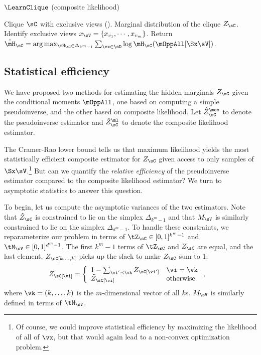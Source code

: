 \begin{algorithm}
  \caption{$\LearnClique$ (composite likelihood)}
  \label{algo:piecewise}
  \begin{algorithmic}
    \REQUIRE Clique $\sC$ with exclusive views ().
    \ENSURE Marginal distribution of the clique $Z_\sC$.
\STATE Identify exclusive views $x_\sV = \{x_{v_1}, \cdots, x_{v_m}\}$.
\STATE Return $\hat \mH_\sC = \arg\max_{\mH_\sC \in \Delta_{k^m-1}} \sum_{\vx \in \sD} \log \mH_\sC(\mOppAll[\Sx \sV])$.
  \end{algorithmic}
\end{algorithm}

\subsection{Statistical efficiency}

We have proposed two methods for estimating the hidden marginals $Z_\sC$ given
the conditional moments $\mOppAll$, one based on computing a simple pseudoinverse,
and the other based on composite likelihood.
Let $\hat Z^\mom_\sC$ to denote the pseudoinverse estimator and $\hat
  Z^\ml_\sC$ to denote the composite likelihood estimator.

The Cramer-Rao lower bound tells us that maximum likelihood yields the
  most statistically efficient composite estimator for $Z_\sC$ given
  access to only samples of $\Sx\sV$.\footnote{Of course, we could improve
  statistical efficiency by maximizing the likelihood of all of $\vx$, but
  that would again lead to a non-convex optimization problem.}
But can we quantify the \emph{relative efficiency} of the pseudoinverse
  estimator compared to the composite likelihood estimator?
We turn to asymptotic statistics to answer this question. 

To begin, let us compute the asymptotic variances of the two estimators. 
Note that $\hat Z_\sC$ is constrained to lie on the simplex
  $\Delta_{k^m-1}$ and that $M_\sV$ is similarly constrained to lie on
  the simplex $\Delta_{d^m-1}$. 
To handle these constraints, we reparameterize our problem in
  terms of $\tZ_\sC \in [0,1]^{k^m-1}$ and $\tM_\sV \in [0,1]^{d^m-1}$.
  The first $k^m -1$ terms of $\tZ_\sC$ and $Z_\sC$ are equal, and the
  last element, $Z_\sC[k, \ldots, k]$ picks up the slack to make $Z_\sC$
  sum to 1:
\begin{align*}
  Z_\sC[\vi] &= \left\{
    \begin{array}{ll}
      1 - \sum_{\vi' \prec \vk} \tilde Z_\sC[\vi'] & \vi = \vk \\
      \tilde Z_\sC[\vi] & \text{otherwise.}
      \end{array}
      \right.,
\end{align*} 
where $\vk = (k, \ldots, k)$ is the $m$-dimensional vector of all $k$s. 
$M_\sV$ is similarly defined in terms of $\tM_\sV$.


